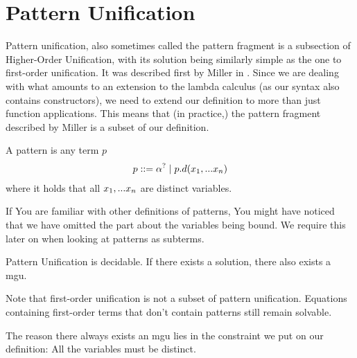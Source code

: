 \documentclass[twoside,12pt,a4paper]{article}
\begin{document}
\section{Pattern Unification}

Pattern unification, also sometimes called the pattern fragment
is a subsection of Higher-Order Unification,
with its solution being similarly simple as the one to first-order unification.
It was described first by Miller in \cite{10.1093/logcom/1.4.497}.
Since we are dealing with what amounts to an extension to the lambda calculus (as our syntax also contains constructors), we need to extend our definition to more than just function applications. 
This means that (in practice,) the pattern fragment described by Miller is a subset of our definition.

\begin{definition}[Pattern]
    A pattern is any term $p$ 
    \begin{align*}
        p ::= \alpha^? \;|\; p.d(x_1,...x_n)
    \end{align*}
    where it holds that all $x_1,...x_n$ are distinct variables.
\end{definition}

If You are familiar with other definitions of patterns, You might have noticed that 
we have omitted the part about the variables being bound. We require this later on when looking at patterns as subterms.


\begin{theorem}
    Pattern Unification is decidable. If there exists a solution, there also exists a mgu.
\end{theorem}

Note that first-order unification is not a subset of pattern unification. 
Equations containing first-order terms that don't contain patterns still remain solvable.

The reason there always exists an mgu lies in the constraint we put on our definition: All the variables must be distinct. 
\end{document}
